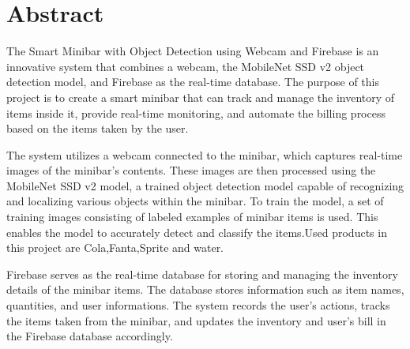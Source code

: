 \chapter*{Abstract}

The Smart Minibar with Object Detection using Webcam and Firebase is an innovative system that combines a webcam, the MobileNet SSD v2 object detection model, and Firebase as the real-time database. The purpose of this project is to create a smart minibar that can track and manage the inventory of items inside it, provide real-time monitoring, and automate the billing process based on the items taken by the user.

The system utilizes a webcam connected to the minibar, which captures real-time images of the minibar's contents. These images are then processed using the MobileNet SSD v2 model, a trained object detection model capable of recognizing and localizing various objects within the minibar. To train the model, a set of training images consisting of labeled examples of minibar items is used. This enables the model to accurately detect and classify the items.Used products in this project are Cola,Fanta,Sprite and water.

Firebase serves as the real-time database for storing and managing the inventory details of the minibar items. The database stores information such as item names, quantities, and user informations. The system records the user's actions, tracks the items taken from the minibar, and updates the inventory and user's bill in the Firebase database accordingly.
\vfill
\clearpage